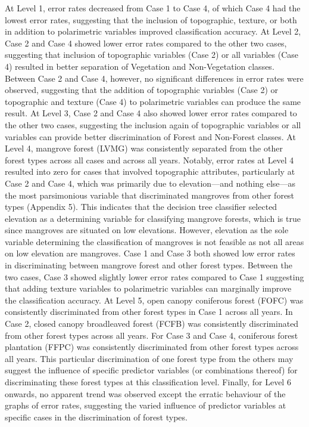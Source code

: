At Level 1, error rates decreased from Case 1 to Case 4, of which Case 4 had the lowest error rates, suggesting that the inclusion of topographic, texture, or both in addition to polarimetric variables improved classification accuracy. At Level 2, Case 2 and Case 4 showed lower error rates compared to the other two cases, suggesting that inclusion of topographic variables (Case 2) or all variables (Case 4) resulted in better separation of Vegetation and Non-Vegetation classes. Between Case 2 and Case 4, however, no significant differences in error rates were observed, suggesting that the addition of topographic variables (Case 2) or topographic and texture (Case 4) to polarimetric variables can produce the same result. At Level 3, Case 2 and Case 4 also showed lower error rates compared to the other two cases, suggesting the inclusion again of topographic variables or all variables can provide better discrimination of Forest and Non-Forest classes. At Level 4, mangrove forest (LVMG) was consistently separated from the other forest types across all cases and across all years. Notably, error rates at Level 4 resulted into zero for cases that involved topographic attributes, particularly at Case 2 and Case 4, which was primarily due to elevation—and nothing else—as the most parsimonious variable that discriminated mangroves from other forest types (Appendix 5). This indicates that the decision tree classifier selected elevation as a determining variable for classifying mangrove forests, which is true since mangroves are situated on low elevations. However, elevation as the sole variable determining the classification of mangroves is not feasible as not all areas on low elevation are mangroves. Case 1 and Case 3 both showed low error rates in discriminating between mangrove forest and other forest types. Between the two cases, Case 3 showed slightly lower error rates compared to Case 1 suggesting that adding texture variables to polarimetric variables can marginally improve the classification accuracy. At Level 5, open canopy coniferous forest (FOFC) was consistently discriminated from other forest types in Case 1 across all years. In Case 2, closed canopy broadleaved forest (FCFB) was consistently discriminated from other forest types across all years. For Case 3 and Case 4, coniferous forest plantation (FFPC) was consistently discriminated from other forest types across all years. This particular discrimination of one forest type from the others may suggest the influence of specific predictor variables (or combinations thereof) for discriminating these forest types at this classification level. Finally, for Level 6 onwards, no apparent trend was observed except the erratic behaviour of the graphs of error rates, suggesting the varied influence of predictor variables at specific cases in the discrimination of forest types.

